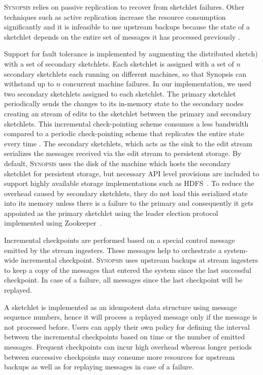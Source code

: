 \textsc{Synopsis} relies on passive replication to recover from sketchlet failures.
Other techniques such as active replication increase the resource consumption significantly and it is infeasible to use upstream backups because the state of a sketchlet depends on the entire set of messages it has processed previously \cite{castro2013integrating}.

Support for fault tolerance is implemented by augmenting the distributed sketch) with a set of secondary sketchlets.
Each sketchlet is assigned with a set of $n$ secondary sketchlets each running on different machines, so that Synopsis can withstand up to $n$ concurrent machine failures.
In our implementation, we used two secondary sketchlets assigned to each sketchlet.
The primary sketchlet periodically sends the changes to its in-memory state to the secondary nodes creating an stream of edits to the sketchlet between the primary and secondary sketchlets.
This incremental check-pointing scheme consumes a less bandwidth compared to a periodic check-pointing scheme that replicates the entire state every time \cite{castro2013integrating}.
The secondary sketchlets, which acts as the sink to the edit stream serializes the messages received via the edit stream to persistent storage.
By default, \textsc{Synopsis} uses the disk of the machine which hosts the secondary sketchlet for persistent storage, but necessary API level provisions are included to support highly available storage implementations such as HDFS~\cite{borthakur2008hdfs}.
To reduce the overhead caused by secondary sketchlets, they do not load this serialized state into its memory unless there is a failure to the primary and consequently it gets appointed as the primary sketchlet using the leader election protocol implemented using Zookeeper~\cite{hunt2010zookeeper}.

Incremental checkpoints are performed based on a special control message emitted by the stream ingesters.
These messages help to orchestrate a system-wide incremental checkpoint.
\textsc{Synopsis} uses upstream backups at stream ingesters to keep a copy of the messages that entered the system since the last successful checkpoint.
In case of a failure, all messages since the last checkpoint will be replayed.

A sketchlet is implemented as an idempotent data structure using message sequence numbers, hence it will process a replayed message only if the message is not processed before.
Users can apply their own policy for defining the interval between the incremental checkpoints based on time or the number of emitted messages.
Frequent checkpoints can incur high overhead whereas longer periods between successive checkpoints may consume more resources for upstream backups as well as for replaying messages in case of a failure.

